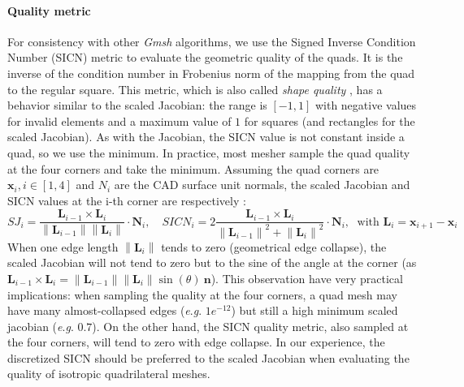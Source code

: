 \documentclass[AMA,STIX1COL]{WileyNJD-v2}
\newcommand{\vx}{\ensuremath{\mathbf{x}}}
\newcommand{\vL}{\ensuremath{\mathbf{L}}}
\newcommand{\vn}{\ensuremath{\mathbf{n}}}
\newcommand{\vN}{\ensuremath{\mathbf{N}}}
\newcommand{\norm}[1]{\left\lVert#1\right\rVert}
\newcommand{\eg}{\textit{e}.\textit{g}. }
\begin{document}
{\paragraph{Quality metric}
For consistency with other \emph{Gmsh} algorithms, we use the Signed Inverse
Condition Number (SICN) metric to evaluate the geometric quality of the quads.
It is the inverse of the condition number in Frobenius norm of the mapping from the
quad to the regular square.  This metric, which is also called \emph{shape quality}
\cite{verdict}, has a behavior similar to the scaled Jacobian: the range is
$[-1,1]$ with negative values for invalid elements and a maximum value of $1$
for squares (and rectangles for the scaled Jacobian).  As with the Jacobian, 
the SICN value is not constant inside a
quad, so we use the minimum. In practice, most mesher sample the quad quality
at the four corners and take the minimum. Assuming the 
quad corners are $\vx_i, i \in [1,4]$ and $N_i$ are the CAD surface unit normals, the scaled Jacobian and SICN values at the i-th corner 
are respectively \cite{verdict}:
\begin{equation}
    SJ_i = \frac{\vL_{i-1} \times \vL_{i}}{\norm{\vL_{i-1}}\norm{\vL_{i}}} \cdot \vN_i,
    \quad
    SICN_i = 2 \frac{\vL_{i-1} \times \vL_{i}}{\norm{\vL_{i-1}}^2+\norm{\vL_{i}}^2} \cdot \vN_i,
    \; \text{ with } \vL_i = \vx_{i+1}-\vx_{i}
\end{equation}
When one edge length $\norm{\vL_i}$ tends to zero (geometrical edge collapse), 
the scaled Jacobian will not tend to zero but to the sine of the angle at the corner
(as $\vL_{i-1} \times \vL_{i}=\norm{\vL_{i-1}}\norm{\vL_{i}} \sin(\theta)\ \vn$).
This observation have very practical implications: 
when sampling the quality at the four corners, a quad mesh may have many almost-collapsed
edges (\eg $1e^{-12}$) but still a high minimum scaled jacobian (\eg $0.7$).
On the other hand, the SICN quality metric, also sampled at the four corners, will
tend to zero with edge collapse. In our experience, the discretized SICN 
should be preferred to the scaled Jacobian when evaluating the quality of isotropic quadrilateral meshes.

}
\end{document}
